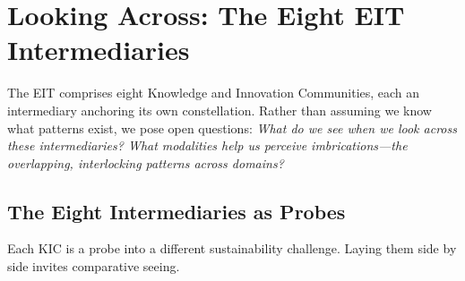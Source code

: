 \documentclass[../main.tex]{subfiles}
\begin{document}
\section{Looking Across: The Eight EIT Intermediaries}

The EIT comprises eight Knowledge and Innovation Communities, each an intermediary anchoring its own constellation. Rather than assuming we know what patterns exist, we pose open questions: \textit{What do we see when we look across these intermediaries? What modalities help us perceive imbrications---the overlapping, interlocking patterns across domains?}

\subsection{The Eight Intermediaries as Probes}

Each KIC is a probe into a different sustainability challenge. Laying them side by side invites comparative seeing.
\end{document}

